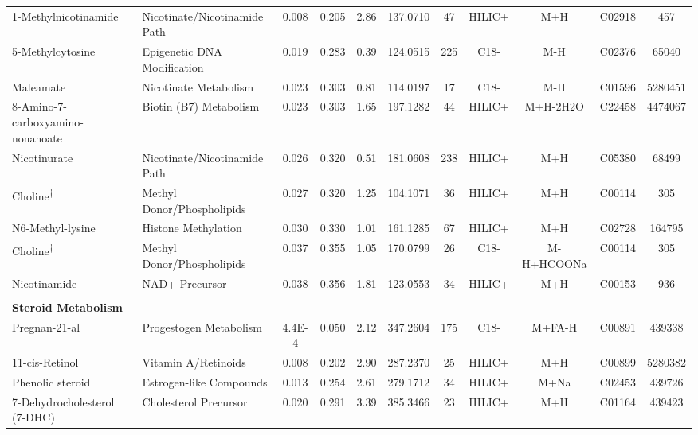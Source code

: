\begin{longtable}[t]{llccccccccc}
\hspace*{0.3cm}1-Methylnicotinamide & Nicotinate/Nicotinamide Path & 0.008 & 0.205 & 2.86 & 137.0710 & 47 & HILIC+ & M+H & C02918 & 457\\
\hspace*{0.3cm}5-Methylcytosine & Epigenetic DNA Modification & 0.019 & 0.283 & 0.39 & 124.0515 & 225 & C18- & M-H & C02376 & 65040\\
\hspace*{0.3cm}Maleamate & Nicotinate Metabolism & 0.023 & 0.303 & 0.81 & 114.0197 & 17 & C18- & M-H & C01596 & 5280451\\
\hspace*{0.3cm}8-Amino-7-carboxyamino-nonanoate & Biotin (B7) Metabolism & 0.023 & 0.303 & 1.65 & 197.1282 & 44 & HILIC+ & M+H-2H2O & C22458 & 4474067\\
\hspace*{0.3cm}Nicotinurate & Nicotinate/Nicotinamide Path & 0.026 & 0.320 & 0.51 & 181.0608 & 238 & HILIC+ & M+H & C05380 & 68499\\

\hspace*{0.3cm}Choline\textsuperscript{†} & Methyl Donor/Phospholipids & 0.027 & 0.320 & 1.25 & 104.1071 & 36 & HILIC+ & M+H & C00114 & 305\\
\hspace*{0.3cm}N6-Methyl-lysine & Histone Methylation & 0.030 & 0.330 & 1.01 & 161.1285 & 67 & HILIC+ & M+H & C02728 & 164795\\
\hspace*{0.3cm}Choline\textsuperscript{†} & Methyl Donor/Phospholipids & 0.037 & 0.355 & 1.05 & 170.0799 & 26 & C18- & M-H+HCOONa & C00114 & 305\\
\hspace*{0.3cm}Nicotinamide & NAD+ Precursor & 0.038 & 0.356 & 1.81 & 123.0553 & 34 & HILIC+ & M+H & C00153 & 936\\
 &  &  &  &  &  &  &  &  &  & \\

\fontsize{9pt}{10.8pt}\selectfont\textbf{\underline{Steroid Metabolism}} &  &  &  &  &  &  &  &  &  & \\
\hspace*{0.3cm}Pregnan-21-al & Progestogen Metabolism & 4.4E-4 & 0.050 & 2.12 & 347.2604 & 175 & C18- & M+FA-H & C00891 & 439338\\
\hspace*{0.3cm}11-cis-Retinol & Vitamin A/Retinoids & 0.008 & 0.202 & 2.90 & 287.2370 & 25 & HILIC+ & M+H & C00899 & 5280382\\
\hspace*{0.3cm}Phenolic steroid & Estrogen-like Compounds & 0.013 & 0.254 & 2.61 & 279.1712 & 34 & HILIC+ & M+Na & C02453 & 439726\\
\hspace*{0.3cm}7-Dehydrocholesterol (7-DHC) & Cholesterol Precursor & 0.020 & 0.291 & 3.39 & 385.3466 & 23 & HILIC+ & M+H & C01164 & 439423\\


\end{longtable}
